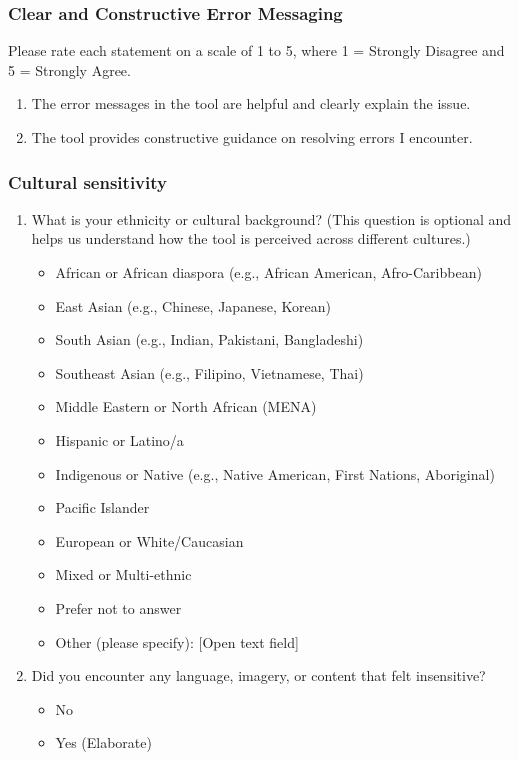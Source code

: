 \documentclass[12pt, titlepage]{article}
\begin{document}
\begin{appendices}
\subsubsection*{Clear and Constructive Error Messaging}
Please rate each statement on a scale of 1 to 5, where 1 = Strongly Disagree and 5 = Strongly Agree.
\begin{enumerate}
  \item The error messages in the tool are helpful and clearly explain the issue.
  \item The tool provides constructive guidance on resolving errors I encounter.
\end{enumerate}

\subsubsection*{Cultural sensitivity}
\begin{enumerate}
  \item What is your ethnicity or cultural background? (This question is optional and helps us understand how the tool is perceived across different cultures.)
  \begin{itemize}
    \item African or African diaspora (e.g., African American, Afro-Caribbean)
    \item East Asian (e.g., Chinese, Japanese, Korean)
    \item South Asian (e.g., Indian, Pakistani, Bangladeshi)
    \item Southeast Asian (e.g., Filipino, Vietnamese, Thai)
    \item Middle Eastern or North African (MENA)
    \item Hispanic or Latino/a
    \item Indigenous or Native (e.g., Native American, First Nations, Aboriginal)
    \item Pacific Islander
    \item European or White/Caucasian
    \item Mixed or Multi-ethnic
    \item Prefer not to answer
    \item Other (please specify): [Open text field] 
  \end{itemize}
  \item Did you encounter any language, imagery, or content that felt insensitive?
  \begin{itemize}
    \item No
    \item Yes (Elaborate)
  \end{itemize}
\end{enumerate}


\end{appendices}
\end{document}

